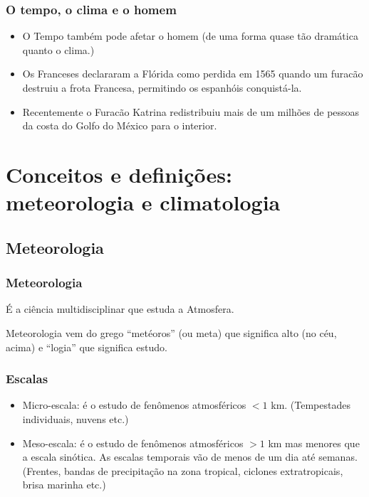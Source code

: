 \begin{frame}
\frametitle{O tempo, o clima e o homem}
  \begin{itemize}[<+-| alert@+>]
    \item O Tempo também pode afetar o homem (de uma forma quase tão dramática
          quanto o clima.)
    \item Os Franceses declararam a Flórida como perdida em 1565 quando um
          furacão destruiu a frota Francesa, permitindo os espanhóis
          conquistá-la.
    \item Recentemente o Furacão Katrina redistribuiu mais de um milhões de
          pessoas da costa do Golfo do México para o interior.
\end{itemize}
\end{frame}

\section{Conceitos e definições: meteorologia e climatologia}
\subsection{Meteorologia}
\begin{frame}
\frametitle{Meteorologia}
  \begin{block}{}
    É a ciência multidisciplinar que estuda a Atmosfera.
  \end{block}
\pause
  \begin{block}{}
    Meteorologia vem do grego ``metéoros'' (ou meta) que significa alto (no céu,
    acima) e ``logia'' que significa estudo.
  \end{block}
\end{frame}

\begin{frame}
\frametitle{Escalas}
  \begin{itemize}[<+-| alert@+>]
    \item Micro-escala: é o estudo de fenômenos atmosféricos
          $< 1$ km. (Tempestades individuais, nuvens etc.)
    \item Meso-escala: é o estudo de fenômenos atmosféricos $> 1$ km mas menores
          que a escala sinótica.  As escalas temporais vão de menos de um dia até
          semanas. (Frentes, bandas de precipitação na zona tropical, ciclones
          extratropicais, brisa marinha etc.)
  \end{itemize}
\end{frame}

